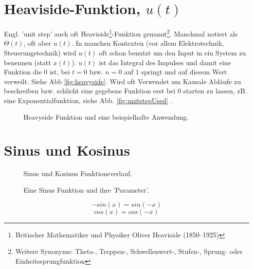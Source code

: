 \section{Heaviside-Funktion, $u(t)$}

Engl. 'unit step' auch oft Heaviside\footnote{Britischer Mathematiker und Physiker Oliver Heaviside (1850–1925)}-Funktion genannt\footnote{Weitere Synonyme: Theta-, Treppen-, Schwellenwert-, Stufen-, Sprung- oder Einheitssprungfunktion}. Manchmal notiert als $\Theta(t)$, oft aber $u(t)$. In manchen Kontexten (vor allem Elektrotechnik, Steuerungstechnik) wird $u(t)$ oft schon benutzt um den Input in ein System zu benennen (statt $x(t)$). $u(t)$ ist das Integral des Impulses und damit eine Funktion die $0$ ist, bei $t=0$ bzw. $n=0$ auf $1$ springt und auf diesem Wert verweilt. Siehe Abb \ref{fig:heavyside}. Wird oft Verwendet um Kausale Abläufe zu beschreiben bzw. schlicht eine gegebene Funktion erst bei 0 starten zu lassen, zB. eine Exponentialfunktion, siehe Abb. \ref{fig:unitstepUsed} .



\begin{figure}[H]
    \centering
    \subfigure[Einheitsschrittfunktion]{
        
        \label{fig:heavyside}
    }
    \hfill
    \caption{Heavyside Funktion und eine beispielhafte Anwendung.}
    \label{fig:unitStepComparison}
\end{figure}

\section{Sinus und Kosinus}
\begin{figure}[H]
	\centering
	
	\caption{Sinus und Kosinus Funktionsverlauf.}
	\label{fig:sincos}
\end{figure}


\begin{figure}[H]
	\centering
	
	\caption{Eine Sinus Funktion und ihre 'Parameter'.}
	\label{fig:sinParams}
\end{figure}


\begin{equation}
-sin(x) = sin(-x)
\end{equation}
\begin{equation}
cos(x) = cos(-x)
\end{equation}

